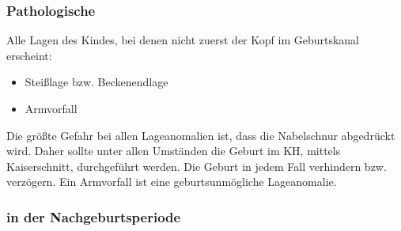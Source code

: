
\subsubsection{Pathologische }

\Text
{{\TxBeschreibung}}%
{%
Alle Lagen des Kindes, bei denen nicht zuerst der 
Kopf im Geburtskanal erscheint:
\begin{itemize}
	\item Steißlage bzw. Beckenendlage
	\item Armvorfall
\end{itemize}
Die größte Gefahr bei allen Lageanomalien ist, dass die
Nabelschnur abgedrückt wird. Daher sollte unter allen
Umständen die Geburt im KH, mittels Kaiserschnitt,
durchgeführt werden. Die Geburt in jedem Fall verhindern
bzw. verzögern. Ein Armvorfall ist eine geburtsunmögliche
Lageanomalie. }%






\subsubsection{}




\subsubsection{ in der Nachgeburtsperiode}


